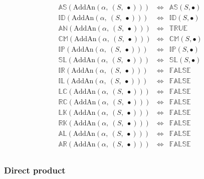 \documentclass[10pt]{article}
\newcommand{\propname}[1]{{\mathbb{#1}}}
\begin{document}
\[
\begin{array}{rcl} 
\propname{AS}(\mathrm{AddAn}(\alpha,\ (S,\ \bullet))) 
  & \Leftrightarrow %
  & \propname{AS}(S, \bullet) \\
\propname{ID}(\mathrm{AddAn}(\alpha,\ (S,\ \bullet))) 
  & \Leftrightarrow %
  & \propname{ID}(S, \bullet) \\
\propname{AN}(\mathrm{AddAn}(\alpha,\ (S,\ \bullet))) 
  & \Leftrightarrow %
  & \propname{TRUE} \\ 
\propname{CM}(\mathrm{AddAn}(\alpha,\ (S,\ \bullet))) 
  & \Leftrightarrow %
  & \propname{CM}(S, \bullet) \\
\propname{IP}(\mathrm{AddAn}(\alpha,\ (S,\ \bullet))) 
  & \Leftrightarrow %
  & \propname{IP}(S, \bullet) \\
\propname{SL}(\mathrm{AddAn}(\alpha,\ (S,\ \bullet))) 
  & \Leftrightarrow %
  & \propname{SL}(S, \bullet) \\
\propname{IR}(\mathrm{AddAn}(\alpha,\ (S,\ \bullet))) 
  & \Leftrightarrow %
  & \propname{FALSE}\\ 
\propname{IL}(\mathrm{AddAn}(\alpha,\ (S,\ \bullet))) 
  & \Leftrightarrow %
  & \propname{FALSE}\\ 
\propname{LC}(\mathrm{AddAn}(\alpha,\ (S,\ \bullet))) 
  & \Leftrightarrow %
  & \propname{FALSE}\\ 
\propname{RC}(\mathrm{AddAn}(\alpha,\ (S,\ \bullet))) 
  & \Leftrightarrow %
  & \propname{FALSE}\\ 
\propname{LK}(\mathrm{AddAn}(\alpha,\ (S,\ \bullet))) 
  & \Leftrightarrow %
  & \propname{FALSE}\\ 
\propname{RK}(\mathrm{AddAn}(\alpha,\ (S,\ \bullet))) 
  & \Leftrightarrow %
  & \propname{FALSE}\\ 
\propname{AL}(\mathrm{AddAn}(\alpha,\ (S,\ \bullet))) 
  & \Leftrightarrow %
  & \propname{FALSE}\\ 
\propname{AR}(\mathrm{AddAn}(\alpha,\ (S,\ \bullet))) 
  & \Leftrightarrow %
  & \propname{FALSE}\\ 
\end{array} 
\] 

\subsubsection{Direct product} 
\end{document}
